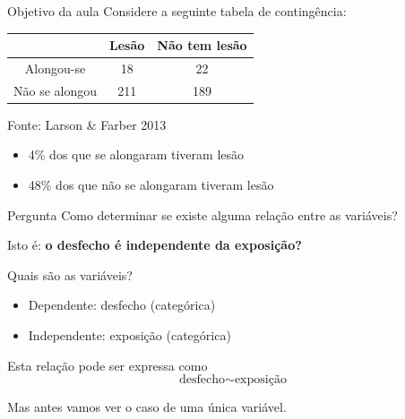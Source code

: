 \documentclass{beamer}
\begin{document}
\begin{frame}{\scriptsize Objetivo da aula}
  \footnotesize
  Considere a seguinte tabela de contingência:

  \bigskip
  \begin{block}{}
    \footnotesize
    \begin{tabular}{c|c|c}
                 & Lesão & Não tem lesão\\
      \hline
      Alongou-se & 18 & 22\\
      \hline
      Não se alongou & 211 & 189\\
    \end{tabular}

    \bigskip
    {\hfill \tiny Fonte: Larson \& Farber 2013}
  \end{block}
  \begin{itemize}
    \tiny
  \item 4\% dos que se alongaram tiveram lesão
  \item 48\% dos que não se alongaram tiveram lesão
  \end{itemize}
  \vfill
  \begin{block}{Pergunta}
    Como determinar se existe alguma relação entre as variáveis?

    \bigskip
    \small
    Isto é: {\bf o desfecho é independente da exposição?}
  \end{block}
\end{frame}

\begin{frame}{\scriptsize Quais são as variáveis?}
  \begin{itemize}
    \footnotesize
  \item Dependente: desfecho (categórica)
  \item Independente: exposição (categórica)
  \end{itemize}
  \vfill
  \begin{block}{Esta relação pode ser expressa como}
    \begin{displaymath}
      \text{desfecho} \sim \text{exposição}
    \end{displaymath}
  \end{block}
\end{frame}

\begin{frame}{\scriptsize }
  \begin{center}
    Mas antes vamos ver o caso de uma única variável.
  \end{center}
\end{frame}
\end{document}
